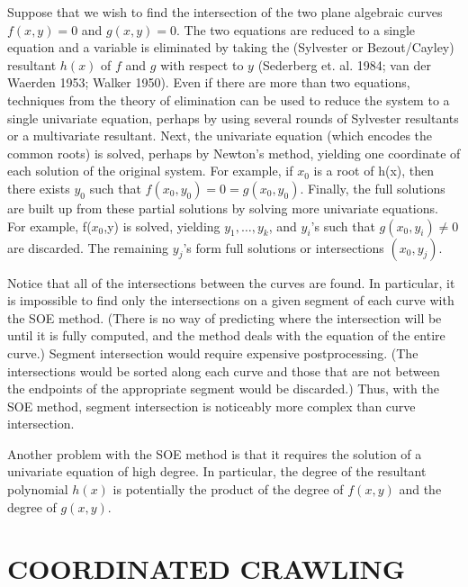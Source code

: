 \begin{example}
Suppose that we wish to find the intersection of the two plane algebraic curves 
$f(x,y)=0$ and $g(x,y)=0$.
The two equations are reduced to a single equation and a variable is eliminated
by taking the (Sylvester or Bezout/Cayley) resultant $h(x)$ of $f$ and $g$ 
with respect to $y$ (Sederberg et. al. 1984; van der Waerden 1953; Walker 1950).
Even if there are more than two equations, techniques from the theory of elimination
can be used to reduce the system to a single univariate equation, perhaps by using several
rounds of Sylvester resultants or a multivariate resultant.
Next, the univariate equation (which encodes the common roots) is solved, 
perhaps by Newton's method, yielding one coordinate of each solution of the original 
system.
For example, if $x_{0}$ is a root of h(x),
then there exists $y_{0}$ such that $f(x_{0},y_{0})=0=g(x_{0},y_{0})$.
Finally, the full solutions are built up from these partial solutions
by solving more univariate equations.
For example, f($x_{0}$,y) is solved, yielding $y_{1},\ldots,y_{k}$,
and $y_{i}$'s such that $g(x_{0},y_{i}) \neq 0$ are discarded.
The remaining $y_{j}$'s form full solutions or intersections $(x_{0},y_{j})$.
\end{example}

Notice that all of the intersections between the curves are found.
In particular, it is impossible to find only the intersections on a given segment of each curve 
with the SOE method.
(There is no way of predicting where the intersection will be until it is fully computed, and
the method deals with the equation of the entire curve.)
Segment intersection would require expensive postprocessing. 
(The intersections would be sorted along each curve and those that are not between the endpoints
of the appropriate segment would be discarded.)
Thus, with the SOE method, segment intersection is noticeably more complex than curve
intersection.

Another problem with the SOE method is that it requires the solution of a univariate equation
of high degree.
In particular, the degree of the resultant polynomial $h(x)$ is potentially
the product of the degree of $f(x,y)$ and the degree of $g(x,y)$.

\section{COORDINATED CRAWLING}
\label{sec-coor}

